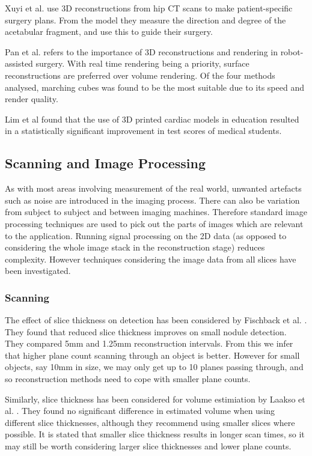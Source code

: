 \documentclass[11p, titlepage]{article}
\begin{document}
Xuyi et al. \cite{xuyi2016application} use 3D reconstructions from hip CT scans to make patient-specific surgery plans. From the model they measure the direction and degree of the acetabular fragment, and use this to guide their surgery.

Pan et al. \cite{pan2017comparison} refers to the importance of 3D reconstructions and rendering in robot-assisted surgery. With real time rendering being a priority, surface reconstructions are preferred over volume rendering. Of the four methods analysed, marching cubes was found to be the most suitable due to its speed and render quality.

Lim et al \cite{lim2016use} found that the use of 3D printed cardiac models in education resulted in a statistically significant improvement in test scores of medical students.

\subsection{Scanning and Image Processing}

As with most areas involving measurement of the real world, unwanted artefacts such as noise are introduced in the imaging process. There can also be variation from subject to subject and between imaging machines. Therefore standard image processing techniques are used to pick out the parts of images which are relevant to the application. Running signal processing on the 2D data (as opposed to considering the whole image stack in the reconstruction stage) reduces complexity. However techniques considering the image data from all slices have been investigated.

\subsubsection{Scanning}

The effect of slice thickness on detection has been considered by Fischback et al. \cite{fischbach2003detection}. They found that reduced slice thickness improves on small nodule detection. They compared 5mm and 1.25mm reconstruction intervals. From this we infer that higher plane count scanning through an object is better. However for small objects, say 10mm in size, we may only get up to 10 planes passing through, and so reconstruction methods need to cope with smaller plane counts.

Similarly, slice thickness has been considered for volume estimiation by Laakso et al. \cite{laakso1997mri}. They found no significant difference in estimated volume when using different slice thicknesses, although they recommend using smaller slices where possible. It is stated that smaller slice thickness results in longer scan times, so it may still be worth considering larger slice thicknesses and lower plane counts.
\end{document}
